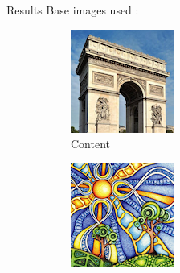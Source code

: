 \documentclass[12pt]{beamer}
\begin{document}
    \begin{frame}{Results}
        Base images used :
        
        \begin{figure}[H]
            \centering
            \begin{subfigure}[b]{0.25\textwidth}
                \centering
                \includegraphics[width=\textwidth]{resources/gatys/inputs/paris.png}
                \caption{Content}
            \end{subfigure}
            \hfill
            \begin{subfigure}[b]{0.25\textwidth}
                \centering
                \includegraphics[width=\textwidth]{resources/gatys/inputs/sun-trees.png}

\end{subfigure}
\end{figure}
\end{frame}
\end{document}
